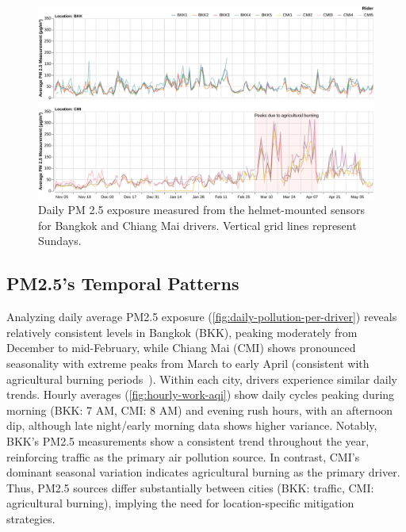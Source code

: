 \begin{figure}
    \centering
    \includegraphics[width=\textwidth]{figures/daily-pollution-per-rider.pdf}
    \caption{
    Daily PM 2.5 exposure measured from the helmet-mounted sensors for Bangkok and Chiang Mai drivers.
    Vertical grid lines represent Sundays.
    }
    \Description{}
    \label{fig:daily-pollution-per-driver}
\end{figure}

\subsection{PM2.5's Temporal Patterns}
Analyzing daily average PM2.5 exposure (\autoref{fig:daily-pollution-per-driver}) reveals relatively consistent levels in Bangkok (BKK), peaking moderately from December to mid-February,
while Chiang Mai (CMI) shows pronounced seasonality with extreme peaks from March to early April (consistent with agricultural burning periods~\cite{david2025chiangmaiburn, bernsten2024chiangmaiburn, iqair2023chiangmaiburn}).
Within each city, drivers experience similar daily trends.
Hourly averages (\autoref{fig:hourly-work-aqi}) show daily cycles peaking during morning (BKK: 7 AM, CMI: 8 AM) and evening rush hours, with an afternoon dip, although late night/early morning data shows higher variance.
Notably, BKK's PM2.5 measurements show a consistent trend throughout the year, reinforcing traffic as the primary air pollution source.
In contrast, CMI's dominant seasonal variation indicates agricultural burning as the primary driver.
Thus, PM2.5 sources differ substantially between cities (BKK: traffic, CMI: agricultural burning), implying the need for location-specific mitigation strategies.

